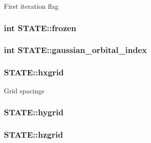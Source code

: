 First iteration flag \hypertarget{struct_s_t_a_t_e_a47e0376ad31687400d14afe75415ab81}{
\subsubsection[{frozen}]{\setlength{\rightskip}{0pt plus 5cm}int S\-T\-A\-T\-E\-::frozen}}\label{struct_s_t_a_t_e_a47e0376ad31687400d14afe75415ab81}
\hypertarget{struct_s_t_a_t_e_a2c3754d1fc95ed0d9a369c878dd19584}{
\subsubsection[{gaussian\-\_\-orbital\-\_\-index}]{\setlength{\rightskip}{0pt plus 5cm}int S\-T\-A\-T\-E\-::gaussian\-\_\-orbital\-\_\-index}}\label{struct_s_t_a_t_e_a2c3754d1fc95ed0d9a369c878dd19584}
\hypertarget{struct_s_t_a_t_e_a2c67ba71c5ec5f4d0a5de4de4f7da374}{
\subsubsection[{hxgrid}]{ S\-T\-A\-T\-E\-::hxgrid}}\label{struct_s_t_a_t_e_a2c67ba71c5ec5f4d0a5de4de4f7da374}
Grid spacings \hypertarget{struct_s_t_a_t_e_a10e0df4f618e57b39d2a4a8df9de66c7}{
\subsubsection[{hygrid}]{ S\-T\-A\-T\-E\-::hygrid}}\label{struct_s_t_a_t_e_a10e0df4f618e57b39d2a4a8df9de66c7}
\hypertarget{struct_s_t_a_t_e_a31527cf6a55775f24bbe080ea9683582}{
\subsubsection[{hzgrid}]{ S\-T\-A\-T\-E\-::hzgrid}}\label{struct_s_t_a_t_e_a31527cf6a55775f24bbe080ea9683582}
